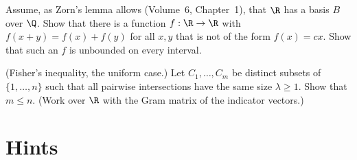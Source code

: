 \begin{exercise}[$\star\star\star$]\label{linear:ex:hamel}
Assume, as Zorn's lemma allows (Volume~6, Chapter~1), that $\R$ has a basis $B$ over $\Q$. Show that there is a function
$f:\R\to\R$ with $f(x+y)=f(x)+f(y)$ for all $x,y$ that is not of the form $f(x)=cx$. Show that such an $f$ is unbounded
on every interval.
\end{exercise}

\begin{exercise}[$\star\star\star$]\label{linear:ex:fisher}
(Fisher's inequality, the uniform case.) Let $C_1,\dots,C_m$ be distinct subsets of $\{1,\dots,n\}$ such that all pairwise
intersections have the same size $\lambda\ge1$. Show that $m\le n$. (Work over $\R$ with the Gram matrix of the indicator
vectors.)
\end{exercise}

\section{Hints}

